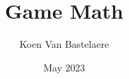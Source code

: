 \documentclass[a4paper,12pt]{book}
\begin{document}
\author{Koen Van Bastelaere}
\title{Game Math}
\date{May 2023}

\frontmatter
\maketitle
\tableofcontents

\mainmatter



\backmatter
\end{document}
